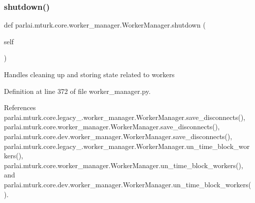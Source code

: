 \subsubsection{\texorpdfstring{shutdown()}{shutdown()}}
{\footnotesize\ttfamily def parlai.\+mturk.\+core.\+worker\+\_\+manager.\+Worker\+Manager.\+shutdown (\begin{DoxyParamCaption}\item[{}]{self }\end{DoxyParamCaption})}

\begin{DoxyVerb}Handles cleaning up and storing state related to workers\end{DoxyVerb}
 

Definition at line 372 of file worker\+\_\+manager.\+py.



References parlai.\+mturk.\+core.\+legacy\+\_.\+worker\+\_\+manager.\+Worker\+Manager.\+save\+\_\+disconnects(), parlai.\+mturk.\+core.\+worker\+\_\+manager.\+Worker\+Manager.\+save\+\_\+disconnects(), parlai.\+mturk.\+core.\+dev.\+worker\+\_\+manager.\+Worker\+Manager.\+save\+\_\+disconnects(), parlai.\+mturk.\+core.\+legacy\+\_.\+worker\+\_\+manager.\+Worker\+Manager.\+un\+\_\+time\+\_\+block\+\_\+workers(), parlai.\+mturk.\+core.\+worker\+\_\+manager.\+Worker\+Manager.\+un\+\_\+time\+\_\+block\+\_\+workers(), and parlai.\+mturk.\+core.\+dev.\+worker\+\_\+manager.\+Worker\+Manager.\+un\+\_\+time\+\_\+block\+\_\+workers().

